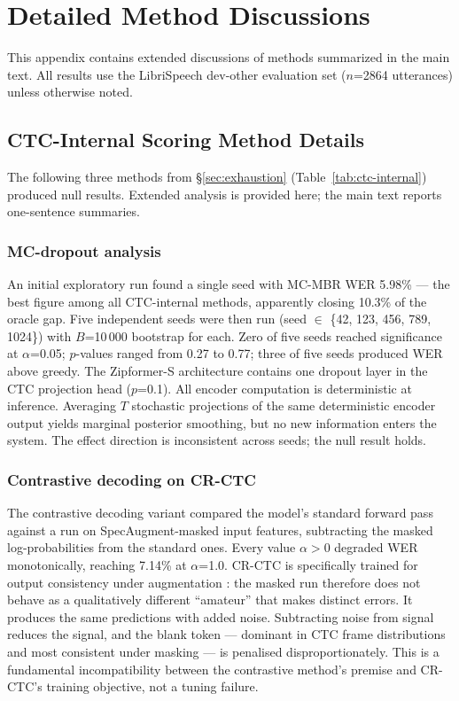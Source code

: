 \section{Detailed Method Discussions}

This appendix contains extended discussions of methods summarized in the main text. All results use the LibriSpeech dev-other evaluation set ($n$=2864 utterances) unless otherwise noted.



\subsection{CTC-Internal Scoring Method Details}

The following three methods from §\ref{sec:exhaustion} (Table~\ref{tab:ctc-internal}) produced null results. Extended analysis is provided here; the main text reports one-sentence summaries.

\subsubsection{MC-dropout analysis}

An initial exploratory run found a single seed with MC-MBR
WER 5.98\% — the best figure among all CTC-internal methods, apparently closing 10.3\% of the oracle
gap. Five independent seeds were then run (seed $\in$ \{42, 123, 456, 789,
1024\}) with $B$=10\,000 bootstrap for each. Zero of five seeds reached significance at $\alpha$=0.05;
$p$-values ranged from 0.27 to 0.77; three of five seeds produced WER above greedy. The
Zipformer-S architecture contains one dropout layer in the CTC projection head ($p$=0.1). All encoder
computation is deterministic at inference. Averaging $T$ stochastic projections of the same
deterministic encoder output yields marginal posterior smoothing, but no new information enters the
system. The effect direction is inconsistent across seeds; the null result holds.

\subsubsection{Contrastive decoding on CR-CTC}

The contrastive decoding variant compared the model's standard forward pass against a run
on SpecAugment-masked \cite{park2019specaugment} input features, subtracting the masked log-probabilities from the standard
ones. Every value $\alpha > 0$ degraded WER monotonically, reaching 7.14\% at $\alpha$=1.0. CR-CTC
is specifically trained for output consistency under augmentation \cite{huang2024crctc}: the masked
run therefore does not behave as a qualitatively different ``amateur'' that makes distinct errors. It
produces the same predictions with added noise. Subtracting noise from signal reduces the signal, and
the blank token — dominant in CTC frame distributions and most consistent under masking — is penalised
disproportionately. This is a fundamental incompatibility between the contrastive method's premise
and CR-CTC's training objective, not a tuning failure.

